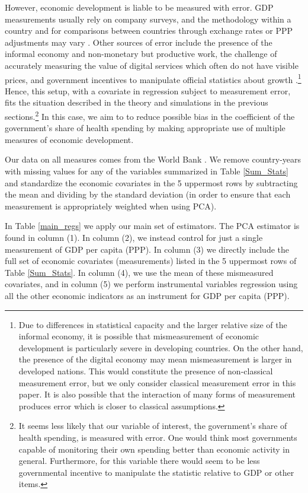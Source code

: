 \documentclass[10pt]{article}
\begin{document}
        However, economic development is liable to be measured with error. GDP measurements usually rely on company surveys, and the methodology within a country and for comparisons between countries through exchange rates or PPP adjustments may vary \citep{grishin_main_2019}. Other sources of error include the presence of the informal economy and non-monetary but productive work, the challenge of accurately measuring the value of digital services which often do not have visible prices, and government incentives to manipulate official statistics about growth \citep{charmes_informal_2012,ahmad_can_2017,nakamura_are_2016}.\footnote{Due to differences in statistical capacity and the larger relative size of the informal economy, it is possible that mismeasurement of economic development is particularly severe in developing countries. On the other hand, the presence of the digital economy may mean mismeasurement is larger in developed nations. This would constitute the presence of non-classical measurement error, but we only consider classical measurement error in this paper. It is also possible that the interaction of many forms of measurement produces error which is closer to classical assumptions.} Hence, this setup, with a covariate in regression subject to measurement error, fits the situation described in the theory and simulations in the previous sections.\footnote{It seems less likely that our variable of interest, the government's share of health spending, is measured with error. One would think most governments capable of monitoring their own spending better than economic activity in general. Furthermore, for this variable there would seem to be less governmental incentive to manipulate the statistic relative to GDP or other items.} In this case, we aim to to reduce possible bias in the coefficient of the government's share of health spending by making appropriate use of multiple measures of economic development.

        Our data on all measures comes from the World Bank \citep{the_world_bank_indicators_2021}. We remove country-years with missing values for any of the variables summarized in Table \ref{Sum_Stats} and standardize the economic covariates in the 5 uppermost rows by subtracting the mean and dividing by the standard deviation (in order to ensure that each measurement is appropriately weighted when using PCA).

        

        In Table \ref{main_regs} we apply our main set of estimators. The PCA estimator is found in column (1). In column (2), we instead control for just a single measurement of GDP per capita (PPP). In column (3) we directly include the full set of economic covariates (measurements) listed in the 5 uppermost rows of Table \ref{Sum_Stats}. In column (4), we use the mean of these mismeasured covariates, and in column (5) we perform instrumental variables regression using all the other economic indicators as an instrument for GDP per capita (PPP).
\end{document}
